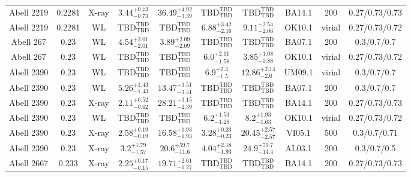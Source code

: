 \begin{table}
\begin{tabular}{cccccccccc}
Abell 2219 & 0.2281 & X-ray & ${3.44}^{+0.73}_{-0.73}$ & ${36.49}^{+4.92}_{-3.39}$ & ${\mathrm{TBD}}^{\mathrm{TBD}}_{\mathrm{TBD}}$ & ${\mathrm{TBD}}^{\mathrm{TBD}}_{\mathrm{TBD}}$ & BA14.1 & 200 & 0.27/0.73/0.73 \\
Abell 2219 & 0.2281 & WL & ${\mathrm{TBD}}^{\mathrm{TBD}}_{\mathrm{TBD}}$ & ${\mathrm{TBD}}^{\mathrm{TBD}}_{\mathrm{TBD}}$ & ${6.88}^{+3.42}_{-2.16}$ & ${9.11}^{+2.54}_{-2.06}$ & OK10.1 & virial & 0.27/0.73/0.72 \\
Abell 267 & 0.23 & WL & ${4.54}^{+2.01}_{-2.01}$ & ${3.89}^{+2.09}_{-2.09}$ & ${\mathrm{TBD}}^{\mathrm{TBD}}_{\mathrm{TBD}}$ & ${\mathrm{TBD}}^{\mathrm{TBD}}_{\mathrm{TBD}}$ & BA07.1 & 200 & 0.3/0.7/0.7 \\
Abell 267 & 0.23 & WL & ${\mathrm{TBD}}^{\mathrm{TBD}}_{\mathrm{TBD}}$ & ${\mathrm{TBD}}^{\mathrm{TBD}}_{\mathrm{TBD}}$ & ${6.0}^{+2.11}_{-1.58}$ & ${3.85}^{+1.08}_{-0.88}$ & OK10.1 & virial & 0.27/0.73/0.72 \\
Abell 2390 & 0.23 & WL & ${\mathrm{TBD}}^{\mathrm{TBD}}_{\mathrm{TBD}}$ & ${\mathrm{TBD}}^{\mathrm{TBD}}_{\mathrm{TBD}}$ & ${6.9}^{+2.3}_{-1.5}$ & ${12.86}^{+2.14}_{-2.0}$ & UM09.1 & virial & 0.3/0.7/0.7 \\
Abell 2390 & 0.23 & WL & ${5.26}^{+1.43}_{-1.43}$ & ${13.47}^{+3.51}_{-3.51}$ & ${\mathrm{TBD}}^{\mathrm{TBD}}_{\mathrm{TBD}}$ & ${\mathrm{TBD}}^{\mathrm{TBD}}_{\mathrm{TBD}}$ & BA07.1 & 200 & 0.3/0.7/0.7 \\
Abell 2390 & 0.23 & X-ray & ${2.11}^{+0.52}_{-0.62}$ & ${28.21}^{+3.15}_{-2.39}$ & ${\mathrm{TBD}}^{\mathrm{TBD}}_{\mathrm{TBD}}$ & ${\mathrm{TBD}}^{\mathrm{TBD}}_{\mathrm{TBD}}$ & BA14.1 & 200 & 0.27/0.73/0.73 \\
Abell 2390 & 0.23 & WL & ${\mathrm{TBD}}^{\mathrm{TBD}}_{\mathrm{TBD}}$ & ${\mathrm{TBD}}^{\mathrm{TBD}}_{\mathrm{TBD}}$ & ${6.2}^{+1.53}_{-1.28}$ & ${8.2}^{+1.93}_{-1.63}$ & OK10.1 & virial & 0.27/0.73/0.72 \\
Abell 2390 & 0.23 & X-ray & ${2.58}^{+0.19}_{-0.19}$ & ${16.58}^{+1.93}_{-1.93}$ & ${3.28}^{+0.23}_{-0.23}$ & ${20.45}^{+2.57}_{-2.57}$ & VI05.1 & 500 & 0.3/0.7/0.71 \\
Abell 2390 & 0.23 & X-ray & ${3.2}^{+1.79}_{-1.57}$ & ${20.6}^{+59.7}_{-11.6}$ & ${4.04}^{+2.18}_{-1.93}$ & ${24.9}^{+79.7}_{-14.4}$ & AL03.1 & 200 & 0.3/0.7/0.5 \\
Abell 2667 & 0.233 & X-ray & ${2.25}^{+0.17}_{-0.15}$ & ${19.71}^{+2.61}_{-1.27}$ & ${\mathrm{TBD}}^{\mathrm{TBD}}_{\mathrm{TBD}}$ & ${\mathrm{TBD}}^{\mathrm{TBD}}_{\mathrm{TBD}}$ & BA14.1 & 200 & 0.27/0.73/0.73 \\

\end{tabular}
\end{table}
